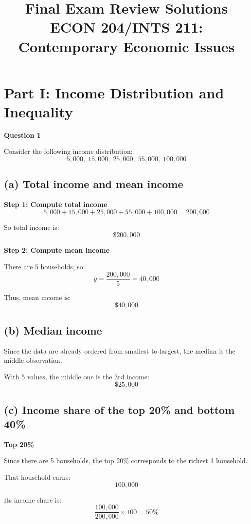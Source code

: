 \documentclass[12pt]{article}
\title{\textbf{Final Exam Review Solutions}\\
ECON 204/INTS 211: Contemporary Economic Issues}
\date{}
\begin{document}
\maketitle

\section*{Part I: Income Distribution and Inequality}

\textbf{Question 1}

Consider the following income distribution:
\[
5{,}000,\; 15{,}000,\; 25{,}000,\; 55{,}000,\; 100{,}000
\]

\subsection*{(a) Total income and mean income}

\textbf{Step 1: Compute total income}
\[
5{,}000 + 15{,}000 + 25{,}000 + 55{,}000 + 100{,}000 = 200{,}000
\]

So total income is:
\[
\boxed{\$200{,}000}
\]

\textbf{Step 2: Compute mean income}

There are 5 households, so:
\[
\bar{y} = \frac{200{,}000}{5} = 40{,}000
\]

Thus, mean income is:
\[
\boxed{\$40{,}000}
\]

\subsection*{(b) Median income}

Since the data are already ordered from smallest to largest, the median is the middle observation.

With 5 values, the middle one is the 3rd income:
\[
\boxed{\$25{,}000}
\]

\subsection*{(c) Income share of the top 20\% and bottom 40\%}

\textbf{Top 20\%}

Since there are 5 households, the top 20\% corresponds to the richest 1 household.

That household earns:
\[
100{,}000
\]

Its income share is:
\[
\frac{100{,}000}{200{,}000} \times 100 = 50\%
\]
\end{document}
